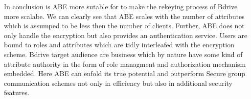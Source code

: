 In conclusion is \ac{ABE} more sutable for to make the rekeying process of Bdrive more scalabe. We can clearly see that \ac{ABE} scales with the number of attributes which is assumped to be less then the number of clients. Further, \ac{ABE} does not only handle the encryption but also provides an authentication service. Users are bound to roles and attributes which are tidly interleafed with the encryption scheme. Bdrive target audience are business which by nature have some kind of attribute authority in the form of role managment and authorization mechanism embedded. Here \ac{ABE} can enfold its true potential and outperform Secure group communication schemes not only in efficiency but also in additional security features. 

